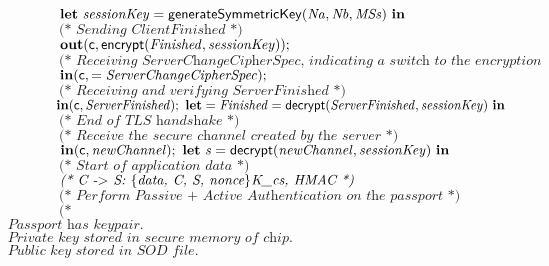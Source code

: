 \begin{tabbing}
$\qquad\qquad \kwl{let}\ \var{sessionKey} = \kwf{generateSymmetricKey}(\var{Na}, \var{Nb}, \var{MSs})\ \kwl{in}$\\
$\qquad\qquad $\\
$\qquad\qquad \textit{(* Sending ClientFinished *)}$\\
$\qquad\qquad \mathbf{out}(\mathsf{c}, \mathsf{encrypt}(\mathit{Finished}, \mathit{sessionKey}));$\\
$\qquad\qquad $\\
$\qquad\qquad \textit{(* Receiving ServerChangeCipherSpec, indicating a switch to the encryption negotiated above. Essentially just 1 byte *)}$\\
$\qquad\qquad \mathbf{in}(\mathsf{c},  = \mathit{ServerChangeCipherSpec});$\\
$\qquad\qquad $\\
$\qquad\qquad \textit{(* Receiving and verifying ServerFinished *)}$\\
$\qquad\qquad \kwl{in}(\kwc{c}, \var{ServerFinished});\ \kwl{let} = \var{Finished} = \kwf{decrypt}(\var{ServerFinished}, \var{sessionKey})\ \kwl{in}$\\
$\qquad\qquad $\\
$\qquad\qquad \textit{(* End of TLS handshake *)}$\\
$\qquad\qquad $\\
$\qquad\qquad \textit{(* Receive the secure channel created by the server *)}$\\
$\qquad\qquad \mathbf{in}(\mathsf{c}, \mathit{newChannel});\ \mathbf{let}\ \mathit{s} = \mathsf{decrypt}(\mathit{newChannel}, \mathit{sessionKey})\ \mathbf{in}$\\
$\qquad\qquad $\\
$\qquad\qquad \textit{(* Start of application data *)}\qquad\qquad $\\
$\qquad\qquad $\\
$\qquad\qquad \textit{(* C -\ensuremath{>} S: \ensuremath{\{}data, C, S, nonce\ensuremath{\}}K{\_}cs, HMAC *)}$\\
$\qquad\qquad $\\
$\qquad\qquad \textit{(* Perform Passive + Active Authentication on the passport *)}$\\
$\qquad\qquad $\\
$\qquad\qquad \textit{(* }$\\
$\textit{	Passport has keypair. }$\\
$\textit{	Private key stored in secure memory of chip. }$\\
$\textit{	Public key stored in SOD file. }$\\

\end{tabbing}
